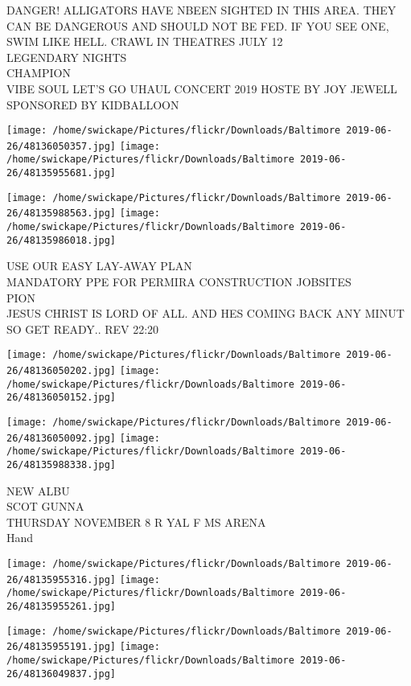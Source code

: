 \documentclass[10pt,letterpaper]{article}
\begin{document}
DANGER! ALLIGATORS HAVE NBEEN SIGHTED IN THIS AREA. THEY CAN BE DANGEROUS AND SHOULD NOT BE FED. IF YOU SEE ONE, SWIM LIKE HELL.  CRAWL IN THEATRES JULY 12\\
LEGENDARY NIGHTS\\
CHAMPION\\
VIBE SOUL LET'S GO UHAUL CONCERT 2019 HOSTE BY JOY JEWELL SPONSORED BY KIDBALLOON
\pagebreak

\texttt{[image: /home/swickape/Pictures/flickr/Downloads/Baltimore 2019-06-26/48136050357.jpg]}
\texttt{[image: /home/swickape/Pictures/flickr/Downloads/Baltimore 2019-06-26/48135955681.jpg]}

\texttt{[image: /home/swickape/Pictures/flickr/Downloads/Baltimore 2019-06-26/48135988563.jpg]}
\texttt{[image: /home/swickape/Pictures/flickr/Downloads/Baltimore 2019-06-26/48135986018.jpg]}

USE OUR EASY LAY{-}AWAY PLAN\\
MANDATORY PPE FOR PERMIRA CONSTRUCTION JOBSITES\\
PION\\
JESUS CHRIST IS LORD OF ALL.  AND HES COMING BACK ANY MINUT SO GET READY.. REV 22:20
\pagebreak

\texttt{[image: /home/swickape/Pictures/flickr/Downloads/Baltimore 2019-06-26/48136050202.jpg]}
\texttt{[image: /home/swickape/Pictures/flickr/Downloads/Baltimore 2019-06-26/48136050152.jpg]}

\texttt{[image: /home/swickape/Pictures/flickr/Downloads/Baltimore 2019-06-26/48136050092.jpg]}
\texttt{[image: /home/swickape/Pictures/flickr/Downloads/Baltimore 2019-06-26/48135988338.jpg]}

NEW ALBU\\
SCOT GUNNA\\
THURSDAY NOVEMBER 8 R YAL F MS ARENA\\
Hand
\pagebreak

\texttt{[image: /home/swickape/Pictures/flickr/Downloads/Baltimore 2019-06-26/48135955316.jpg]}
\texttt{[image: /home/swickape/Pictures/flickr/Downloads/Baltimore 2019-06-26/48135955261.jpg]}

\texttt{[image: /home/swickape/Pictures/flickr/Downloads/Baltimore 2019-06-26/48135955191.jpg]}
\texttt{[image: /home/swickape/Pictures/flickr/Downloads/Baltimore 2019-06-26/48136049837.jpg]}
\end{document}
